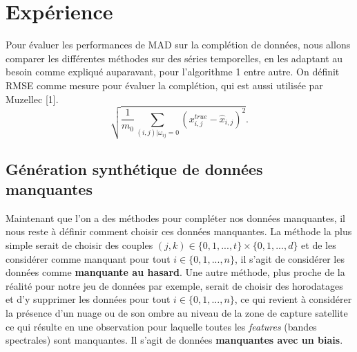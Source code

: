 \documentclass[acmsmall, natbib=false, nonacm]{acmart}
\begin{document}
\section{Expérience}

Pour évaluer les performances de MAD sur la complétion de données, nous allons comparer les différentes méthodes sur des séries temporelles, en les adaptant au besoin comme expliqué auparavant, pour l'algorithme 1 entre autre.
On définit RMSE comme mesure pour évaluer la complétion, qui est aussi utilisée par Muzellec [1].
\begin{equation}\tag{RMSE}
    \sqrt{\frac{1}{m_0} \sum_{(i,j)|\omega_{ij} = 0} (x^{true}_{i,j} - \hat{x}_{i,j})^2 }.
\end{equation}

\subsection{Génération synthétique de données manquantes}
Maintenant que l'on a des méthodes pour compléter nos données manquantes, il nous reste à définir comment choisir ces données manquantes.
La méthode la plus simple serait de choisir des couples $(j,k) \in \{0, 1, ..., t\}\times \{0, 1, ..., d\}$ et de les considérer comme manquant pour tout $i \in \{0, 1, ..., n\}$,
il s'agit de considérer les données comme \textbf{manquante au hasard}.
Une autre méthode, plus proche de la réalité pour notre jeu de données par exemple, serait de choisir des horodatages et d'y supprimer les données pour tout $i \in \{0, 1, ..., n\}$,
ce qui revient à considérer la présence d'un nuage ou de son ombre au niveau de la zone de capture satellite ce qui résulte en une observation pour laquelle toutes les \textit{features} (bandes spectrales) sont manquantes. 
Il s'agit de données \textbf{manquantes avec un biais}.
\end{document}
